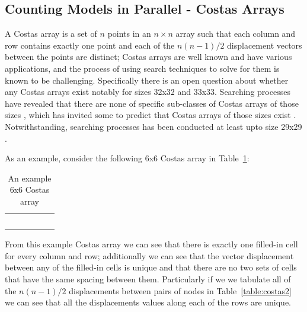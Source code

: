 \documentclass[
10pt, %
a4paper, %
oneside, %
headinclude,footinclude, %
BCOR5mm, %
]{scrartcl}
\begin{document}
\subsection{Counting Models in Parallel - Costas Arrays}\label{section:costas_arrays}

A Costas array is a set of $n$ points in an $n\times n$ array such that each column and row contains exactly one point and each of the $n(n-1)/2$ displacement vectors between the points are distinct; Costas arrays are well known and have various applications, and the process of using search techniques to solve for them is known to be challenging.
Specifically there is an open question about whether any Costas arrays exist notably for sizes 32x32 and 33x33.
Searching processes have revealed that there are none of specific sub-classes of Costas arrays of those sizes \cite{748721}, which has invited some to predict that Costas arrays of those sizes exist \cite{conf/ciss/RussoEB10}.
Notwithstanding, searching processes has been conducted at least upto size 29x29 \cite{DBLP:journals/amco/DrakakisIRW11}.


As an example, consider the following 6x6 Costas array in Table~\ref{table:costas1}:

\begin{table}[h]
\centering
\begin{tabular}{|l|l|l|l|l|l|}
\hline
                         &                          & \cellcolor[HTML]{333333} &                          &                          &                          \\ \hline
                         &                          &                          &                          & \cellcolor[HTML]{333333} &                          \\ \hline
                         &                          &                          &                          &                          & \cellcolor[HTML]{333333} \\ \hline
\cellcolor[HTML]{333333} &                          &                          &                          &                          &                          \\ \hline
                         &                          &                          & \cellcolor[HTML]{333333} &                          &                          \\ \hline
                         & \cellcolor[HTML]{333333} &                          &                          &                          &                          \\ \hline
\end{tabular}
\caption{An example 6x6 Costas array}\label{table:costas1}
\end{table}
From this example Costas array we can see that there is exactly one filled-in cell for every column and row; additionally we can see that the vector displacement between any of the filled-in cells is unique and that there are no two sets of cells that have the same spacing between them. Particularly if we we tabulate all of the $n(n-1)/2$ displacements between pairs of nodes in Table~\ref{table:costas2} we can see that all the displacements values along each of the rows are unique.
\end{document}
